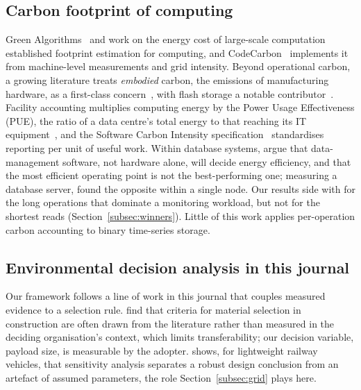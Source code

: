 \documentclass[pdflatex,sn-basic]{sn-jnl}%
\begin{document}
\subsection{Carbon footprint of computing}\label{subsec:carbonlit}
Green Algorithms~\citep{lannelongue_green_algorithms} and work on the energy cost of large-scale computation~\citep{strubell_energy_nlp} established footprint estimation for computing, and CodeCarbon~\citep{codecarbon} implements it from machine-level measurements and grid intensity. Beyond operational carbon, a growing literature treats \emph{embodied} carbon, the emissions of manufacturing hardware, as a first-class concern~\citep{gupta_chasing_carbon}, with flash storage a notable contributor~\citep{tannu_ssd_embodied}. Facility accounting multiplies computing energy by the Power Usage Effectiveness (PUE), the ratio of a data centre's total energy to that reaching its IT equipment~\citep{shehabi_us_datacenter,masanet_datacenter_energy}, and the Software Carbon Intensity specification~\citep{gsf_sci} standardises reporting per unit of useful work. Within database systems, \citet{harizopoulos_energy_dbms} argue that data-management software, not hardware alone, will decide energy efficiency, and that the most efficient operating point is not the best-performing one; measuring a database server, \citet{tsirogiannis_db_server_energy} found the opposite within a single node. Our results side with \citet{tsirogiannis_db_server_energy} for the long operations that dominate a monitoring workload, but not for the shortest reads (Section~\ref{subsec:winners}). Little of this work applies per-operation carbon accounting to binary time-series storage.

\subsection{Environmental decision analysis in this journal}\label{subsec:esd}
Our framework follows a line of work in this journal that couples measured evidence to a selection rule. \citet{bajwa_material_selection_mcdm} find that criteria for material selection in construction are often drawn from the literature rather than measured in the deciding organisation's context, which limits transferability; our decision variable, payload size, is measurable by the adopter. \citet{kraft_lca_railway_sensitivity} shows, for lightweight railway vehicles, that sensitivity analysis separates a robust design conclusion from an artefact of assumed parameters, the role Section~\ref{subsec:grid} plays here.
\end{document}
